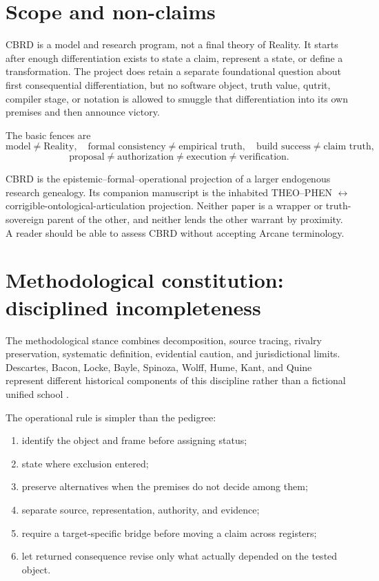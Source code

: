 \section{Scope and non-claims}

CBRD is a model and research program, not a final theory of Reality. It starts after enough differentiation exists to state a claim, represent a state, or define a transformation. The project does retain a separate foundational question about first consequential differentiation, but no software object, truth value, qutrit, compiler stage, or notation is allowed to smuggle that differentiation into its own premises and then announce victory.

The basic fences are
\begin{equation}
\text{model}\neq\text{Reality},\quad
\text{formal consistency}\neq\text{empirical truth},\quad
\text{build success}\neq\text{claim truth},
\end{equation}
\begin{equation}
\text{proposal}\neq\text{authorization}\neq\text{execution}\neq\text{verification}.
\end{equation}

CBRD is the epistemic--formal--operational projection of a larger endogenous research genealogy. Its companion \AM manuscript is the inhabited THEO--PHEN $\leftrightarrow$ corrigible-ontological-articulation projection. Neither paper is a wrapper or truth-sovereign parent of the other, and neither lends the other warrant by proximity. A reader should be able to assess CBRD without accepting Arcane terminology.

\section{Methodological constitution: disciplined incompleteness}

The methodological stance combines decomposition, source tracing, rivalry preservation, systematic definition, evidential caution, and jurisdictional limits. Descartes, Bacon, Locke, Bayle, Spinoza, Wolff, Hume, Kant, and Quine represent different historical components of this discipline rather than a fictional unified school \cite{Descartes1641,Bacon2000NewOrganon,Locke1975Essay,Bayle1991Dictionary,Spinoza1996Ethics,Wolff1730Ontologia,Hume1748,Kant1781,Quine1948WhatThereIs}.

The operational rule is simpler than the pedigree:
\begin{enumerate}
\item identify the object and frame before assigning status;
\item state where exclusion entered;
\item preserve alternatives when the premises do not decide among them;
\item separate source, representation, authority, and evidence;
\item require a target-specific bridge before moving a claim across registers;
\item let returned consequence revise only what actually depended on the tested object.
\end{enumerate}

